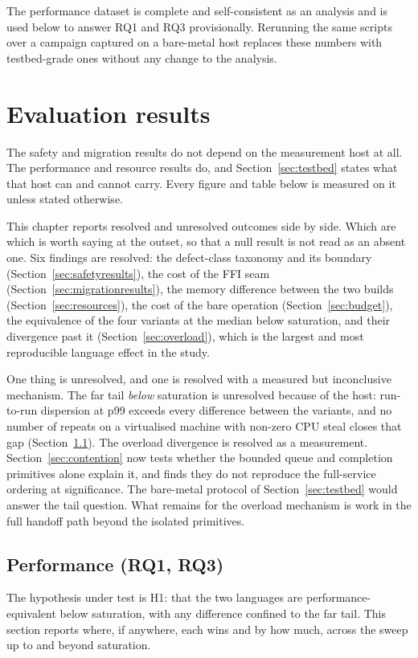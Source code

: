 \documentclass[english,twoside,openright,a4paper,censored,csm,software-track-2020]{HYthesisML}
\begin{document}
The performance dataset is complete and self-consistent as an analysis and is used below to
answer RQ1 and RQ3 provisionally. Rerunning the same scripts over a campaign captured on a
bare-metal host replaces these numbers with testbed-grade ones without any change to the
analysis.

\section{Evaluation results}
The safety and migration results do not depend on the measurement host at all. The performance and
resource results do, and Section~\ref{sec:testbed} states what that host can and cannot carry.
Every figure and table below is measured on it unless stated otherwise.

This chapter reports resolved and unresolved outcomes side by side. Which are which is worth
saying at the outset, so that a null result is not read as an absent one. Six findings are
resolved: the defect-class taxonomy and its boundary (Section~\ref{sec:safetyresults}), the cost
of the FFI seam (Section~\ref{sec:migrationresults}), the memory difference between the two builds
(Section~\ref{sec:resources}), the cost of the bare operation (Section~\ref{sec:budget}), the
equivalence of the four variants at the median below saturation, and their divergence past it
(Section~\ref{sec:overload}), which is the largest and most reproducible language effect in the
study.

One thing is unresolved, and one is resolved with a measured but inconclusive mechanism. The far
tail \emph{below} saturation is unresolved because of the host: run-to-run dispersion at p99
exceeds every difference between the variants, and no number of repeats on a virtualised machine
with non-zero CPU steal closes that gap (Section~\ref{sec:perfresults}). The overload divergence
is resolved as a measurement. Section~\ref{sec:contention} now tests whether the bounded queue and
completion primitives alone explain it, and finds they do not reproduce the full-service ordering
at significance. The bare-metal protocol of Section~\ref{sec:testbed} would answer the tail
question. What remains for the overload mechanism is work in the full handoff path beyond the
isolated primitives.

\subsection{Performance (RQ1, RQ3)}\label{sec:perfresults}
The hypothesis under test is H1: that the two languages are performance-equivalent below
saturation, with any difference confined to the far tail. This section reports where, if
anywhere, each wins and by how much, across the sweep up to and beyond saturation.
\end{document}
